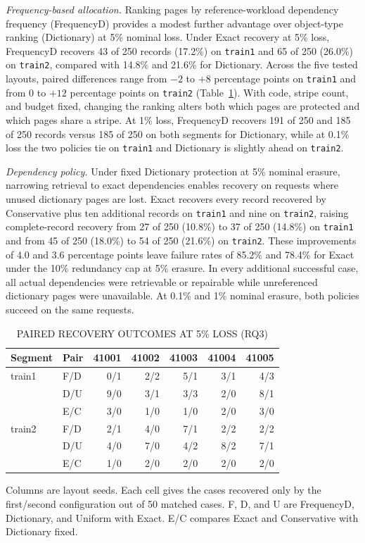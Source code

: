 \documentclass[10pt,journal]{IEEEtran}
\newcommand{\tabnote}[1]{\par\smallskip\parbox{\linewidth}{\footnotesize #1}}
\begin{document}
\emph{Frequency-based allocation.}
Ranking pages by reference-workload dependency frequency (FrequencyD) provides a modest further advantage over object-type ranking (Dictionary) at 5\% nominal loss. Under Exact recovery at 5\% loss, FrequencyD recovers 43 of 250 records (17.2\%) on \texttt{train1} and 65 of 250 (26.0\%) on \texttt{train2}, compared with 14.8\% and 21.6\% for Dictionary. Across the five tested layouts, paired differences range from $-2$ to $+8$ percentage points on \texttt{train1} and from $0$ to $+12$ percentage points on \texttt{train2} (Table~\ref{tab:paired-layouts}). With code, stripe count, and budget fixed, changing the ranking alters both which pages are protected and which pages share a stripe. At 1\% loss, FrequencyD recovers 191 of 250 and 185 of 250 records versus 185 of 250 on both segments for Dictionary, while at 0.1\% loss the two policies tie on \texttt{train1} and Dictionary is slightly ahead on \texttt{train2}.

\emph{Dependency policy.}
Under fixed Dictionary protection at 5\% nominal erasure, narrowing retrieval to exact dependencies enables recovery on requests where unused dictionary pages are lost. Exact recovers every record recovered by Conservative plus ten additional records on \texttt{train1} and nine on \texttt{train2}, raising complete-record recovery from 27 of 250 (10.8\%) to 37 of 250 (14.8\%) on \texttt{train1} and from 45 of 250 (18.0\%) to 54 of 250 (21.6\%) on \texttt{train2}. These improvements of 4.0 and 3.6 percentage points leave failure rates of 85.2\% and 78.4\% for Exact under the 10\% redundancy cap at 5\% erasure. In every additional successful case, all actual dependencies were retrievable or repairable while unreferenced dictionary pages were unavailable. At 0.1\% and 1\% nominal erasure, both policies succeed on the same requests.

\begin{table}[t]
\centering\small
\caption{PAIRED RECOVERY OUTCOMES AT 5\% LOSS (RQ3)}
\label{tab:paired-layouts}
\setlength{\tabcolsep}{3pt}
\begin{tabular}{@{}llrrrrr@{}}
\toprule
Segment & Pair & 41001 & 41002 & 41003 & 41004 & 41005 \\
\midrule
train1 & F/D & 0/1 & 2/2 & 5/1 & 3/1 & 4/3 \\
       & D/U & 9/0 & 3/1 & 3/3 & 2/0 & 8/1 \\
       & E/C & 3/0 & 1/0 & 1/0 & 2/0 & 3/0 \\
\midrule
train2 & F/D & 2/1 & 4/0 & 7/1 & 2/2 & 2/2 \\
       & D/U & 4/0 & 7/0 & 4/2 & 8/2 & 7/1 \\
       & E/C & 1/0 & 2/0 & 2/0 & 2/0 & 2/0 \\
\bottomrule
\end{tabular}
\tabnote{Columns are layout seeds. Each cell gives the cases recovered only by the first/second configuration out of 50 matched cases. F, D, and U are FrequencyD, Dictionary, and Uniform with Exact. E/C compares Exact and Conservative with Dictionary fixed.}
\end{table}
\end{document}
